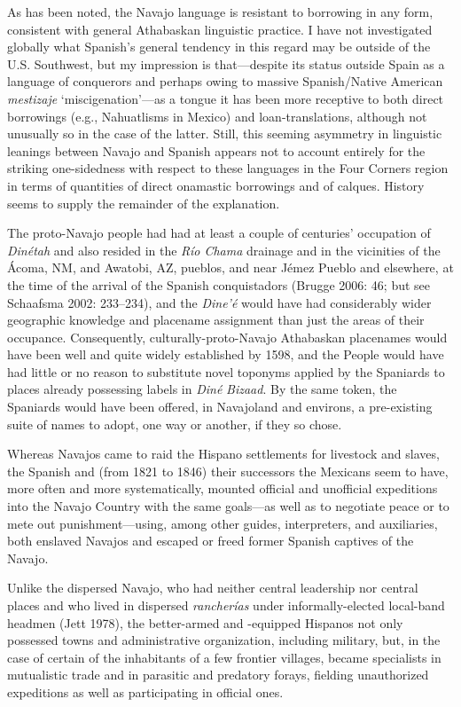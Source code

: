As has been noted, the Navajo language is resistant to borrowing in any form, consistent with general Athabaskan linguistic practice.  I have not investigated globally what Spanish’s general tendency in this regard may be outside of the U.S. Southwest, but my impression is that—despite its status outside Spain as a language of conquerors and perhaps owing to massive Spanish/Native American \textit{mestizaje} ‘miscigenation’—as a tongue it has been more receptive to both direct borrowings (e.g., Nahuatlisms in Mexico) and loan-translations, although not unusually so in the case of the latter.  Still, this seeming asymmetry in linguistic leanings between Navajo and Spanish appears not to account entirely for the striking one-sidedness with respect to these languages in the Four Corners region in terms of quantities of direct onamastic borrowings and of calques.  History seems to supply the remainder of the explanation.

  The proto-Navajo people had had at least a couple of centuries’ occupation of \textit{Dinétah} and also resided in the \textit{Río Chama} drainage and in the vicinities of the Ácoma, NM, and Awatobi, AZ, pueblos, and near Jémez Pueblo and elsewhere, at the time of the arrival of the Spanish conquistadors (Brugge 2006: 46; but see Schaafsma 2002: 233–234), and the \textit{Dine’é} would have had considerably wider geographic knowledge and placename assignment than just the areas of their occupance.  Consequently, culturally-proto-Navajo Athabaskan placenames would have been well and quite widely established by 1598, and the People would have had little or no reason to substitute novel toponyms applied by the Spaniards to places already possessing labels in \textit{Diné} \textit{Bizaad}.  By the same token, the Spaniards would have been offered, in Navajoland and environs, a pre-existing suite of names to adopt, one way or another, if they so chose.

  Whereas Navajos came to raid the Hispano settlements for livestock and slaves, the Spanish and (from 1821 to 1846) their successors the Mexicans seem to have, more often and more systematically, mounted official and unofficial expeditions into the Navajo Country with the same goals—as well as to negotiate peace or to mete out punishment—using, among other guides, interpreters, and auxiliaries, both enslaved Navajos and escaped or freed former Spanish captives of the Navajo.

  Unlike the dispersed Navajo, who had neither central leadership nor central places and who lived in dispersed \textit{rancherías} under informally-elected local-band headmen (Jett 1978), the better-armed and -equipped Hispanos not only possessed towns and administrative organization, including military, but, in the case of certain of the inhabitants of a few frontier villages, became specialists in mutualistic trade and in parasitic and predatory forays, fielding unauthorized expeditions as well as participating in official ones.

